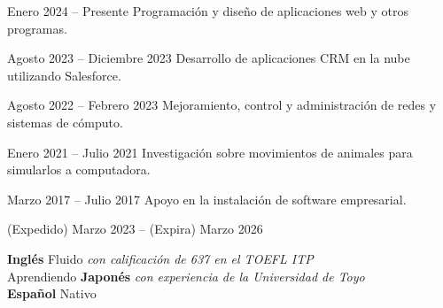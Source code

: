 \documentclass[a4paper,11pt]{memoir} %
\begin{document}
\userinformation %

\framebreak %


\heading{\fullname} %



\Sep


{Enero 2024 -- Presente}
{Programación y diseño de aplicaciones web y otros programas.}

{Agosto 2023 -- Diciembre 2023}
{Desarrollo de aplicaciones CRM en la nube utilizando Salesforce.}

{Agosto 2022 -- Febrero 2023}
{Mejoramiento, control y administración de redes y sistemas de cómputo.}

{Enero 2021 -- Julio 2021}
{Investigación sobre movimientos de animales para simularlos a computadora.}

{Marzo 2017 -- Julio 2017}
{Apoyo en la instalación de software empresarial.}

\Sep


{(Expedido) Marzo 2023 -- (Expira) Marzo 2026}{}

\Sep


\techtable

\Sep


\bluebullet \textbf{Inglés} Fluido \textit{con calificación de 637 en el TOEFL ITP} \\
\bluebullet Aprendiendo \textbf{Japonés} \textit{con experiencia de la Universidad de Toyo} \\
\bluebullet \textbf{Español} Nativo \\
\end{document}
